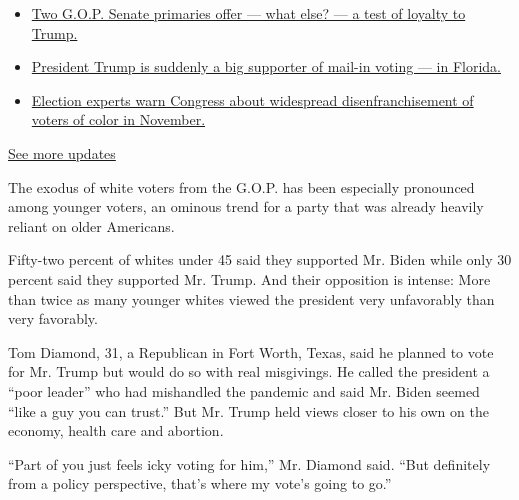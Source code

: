 \begin{itemize}
\tightlist
\item
  \href{https://www.nytimes3xbfgragh.onion/2020/08/04/us/elections/primary-election-michigan-arizona-kansas.html?action=click\&pgtype=Article\&state=default\&region=MAIN_CONTENT_1\&context=storylines_live_updates\#link-3924dd44}{Two
  G.O.P. Senate primaries offer --- what else? --- a test of loyalty to
  Trump.}
\item
  \href{https://www.nytimes3xbfgragh.onion/2020/08/04/us/elections/primary-election-michigan-arizona-kansas.html?action=click\&pgtype=Article\&state=default\&region=MAIN_CONTENT_1\&context=storylines_live_updates\#link-32b39e33}{President
  Trump is suddenly a big supporter of mail-in voting --- in Florida.}
\item
  \href{https://www.nytimes3xbfgragh.onion/2020/08/04/us/elections/primary-election-michigan-arizona-kansas.html?action=click\&pgtype=Article\&state=default\&region=MAIN_CONTENT_1\&context=storylines_live_updates\#link-6d019753}{Election
  experts warn Congress about widespread disenfranchisement of voters of
  color in November.}
\end{itemize}

\href{https://www.nytimes3xbfgragh.onion/2020/08/04/us/elections/primary-election-michigan-arizona-kansas.html?action=click\&pgtype=Article\&state=default\&region=MAIN_CONTENT_1\&context=storylines_live_updates}{See
more updates}

The exodus of white voters from the G.O.P. has been especially
pronounced among younger voters, an ominous trend for a party that was
already heavily reliant on older Americans.

Fifty-two percent of whites under 45 said they supported Mr. Biden while
only 30 percent said they supported Mr. Trump. And their opposition is
intense: More than twice as many younger whites viewed the president
very unfavorably than very favorably.

Tom Diamond, 31, a Republican in Fort Worth, Texas, said he planned to
vote for Mr. Trump but would do so with real misgivings. He called the
president a ``poor leader'' who had mishandled the pandemic and said Mr.
Biden seemed ``like a guy you can trust.'' But Mr. Trump held views
closer to his own on the economy, health care and abortion.

``Part of you just feels icky voting for him,'' Mr. Diamond said. ``But
definitely from a policy perspective, that's where my vote's going to
go.''

